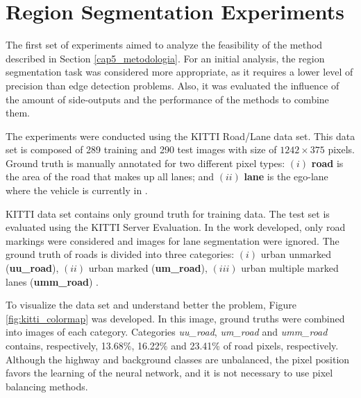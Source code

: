 \section{Region Segmentation Experiments}
\label{cap6_result_experm_1}

The first set of experiments aimed to analyze the feasibility of the method described in Section \ref{cap5_metodologia}.
For an initial analysis, the region segmentation task was considered more appropriate, as it requires a lower level of precision than edge detection problems.
Also, it was evaluated the influence of the amount of side-outputs and the performance of the methods to combine them.

The experiments were conducted using the KITTI Road/Lane data set.
This data set is composed of 289 training and 290 test images with size of $1242 \times 375$ pixels. 
Ground truth is manually annotated for two different pixel types: $(i)$ \textbf{road} is the area of the road that makes up all lanes; and $(ii)$ \textbf{lane} is the ego-lane where the vehicle is currently in \cite{Fritsch2013ITSC}.

KITTI data set contains only ground truth for training data.
The test set is evaluated using the KITTI Server Evaluation.
In the work developed, only road markings were considered and images for lane segmentation were ignored.
The ground truth of roads is divided into three categories: $(i)$ urban unmarked (\textbf{uu\_road}), $(ii)$ urban marked (\textbf{um\_road}), $(iii)$ urban multiple marked lanes (\textbf{umm\_road}) \cite{Fritsch2013ITSC}.


{\color{blue}
To visualize the data set and understand better the problem, Figure \ref{fig:kitti_colormap} was developed.
In this image, ground truths were combined into images of each category. 
Categories \textit{uu\_road}, \textit{um\_road} and \textit{umm\_road} contains, respectively, 13.68\%, 16.22\% and 23.41\% of road pixels, respectively.
Although the highway and background classes are unbalanced, the pixel position favors the learning of the neural network, and it is not necessary to use pixel balancing methods.
}

